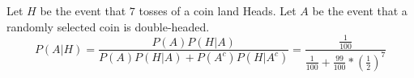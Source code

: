 Let $H$ be the event that $7$ tosses of a coin land Heads. Let $A$ be the event that a randomly selected coin is double-headed. $$P(A|H) = \frac{P(A)P(H|A)}{P(A)P(H|A) + P(A^{c})P(H|A^{c})} = \frac{\frac{1}{100}}{\frac{1}{100} + \frac{99}{100}*\left(\frac{1}{2}\right)^{7}}$$